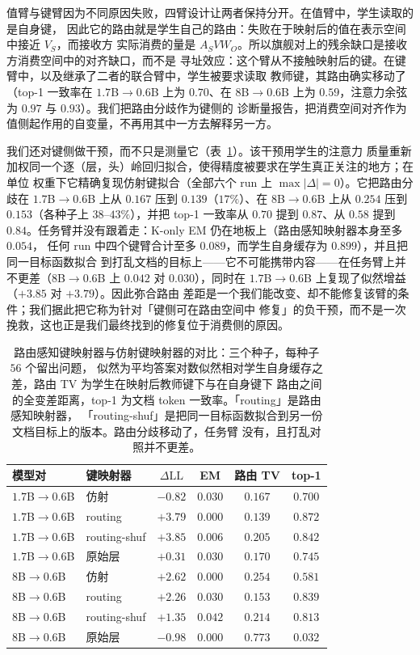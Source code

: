 \documentclass[11pt]{article}
\newcommand{\dll}{\Delta\text{LL}}
\begin{document}
值臂与键臂因为不同原因失败，四臂设计让两者保持分开。在值臂中，学生读取的是自身键，
因此它的路由就是学生自己的路由：失败在于映射后的值在表示空间中接近 $V_S$，而接收方
实际消费的量是 $A_S V W_O$。所以旗舰对上的残余缺口是接收方消费空间中的对齐缺口，而不是
寻址效应：这个臂从不接触映射后的键。在键臂中，以及继承了二者的联合臂中，学生被要求读取
教师键，其路由确实移动了（top-1 一致率在 $1.7$B$\to0.6$B 上为 $0.70$、在
$8$B$\to0.6$B 上为 $0.59$，注意力余弦为 $0.97$ 与 $0.93$）。我们把路由分歧作为键侧的
诊断量报告，把消费空间对齐作为值侧起作用的自变量，不再用其中一方去解释另一方。

我们还对键侧做干预，而不只是测量它（表~\ref{tab:routingkey}）。该干预用学生的注意力
质量重新加权同一个逐（层，头）岭回归拟合，使得精度被要求在学生真正关注的地方；在单位
权重下它精确复现仿射键拟合（全部六个 run 上 $\max|\Delta| = 0$）。它把路由分歧在
$1.7$B$\to0.6$B 上从 $0.167$ 压到 $0.139$（$17\%$）、在 $8$B$\to0.6$B 上从 $0.254$ 压到
$0.153$（各种子上 $38$--$43\%$），并把 top-1 一致率从 $0.70$ 提到 $0.87$、从 $0.58$ 提到
$0.84$。任务臂并没有跟着走：K-only EM 仍在地板上（路由感知映射器本身至多 $0.054$，
任何 run 中四个键臂合计至多 $0.089$，而学生自身缓存为 $0.899$），并且把同一目标函数拟合
到打乱文档的目标上——它不可能携带内容——在任务臂上并不更差（$8$B$\to0.6$B 上 $0.042$ 对
$0.030$），同时在 $1.7$B$\to0.6$B 上复现了似然增益（$+3.85$ 对 $+3.79$）。因此弥合路由
差距是一个我们能改变、却不能修复该臂的条件；我们据此把它称为针对「键侧可在路由空间中
修复」的负干预，而不是一次挽救，这也正是我们最终找到的修复位于消费侧的原因。

\begin{table}[t]
\centering
\small
\caption{路由感知键映射器与仿射键映射器的对比：三个种子，每种子 $56$ 个留出问题，
似然为平均答案对数似然相对学生自身缓存之差，路由 TV 为学生在映射后教师键下与在自身键下
路由之间的全变差距离，top-1 为文档 token 一致率。「routing」是路由感知映射器，
「routing-shuf」是把同一目标函数拟合到另一份文档目标上的版本。路由分歧移动了，任务臂
没有，且打乱对照并不更差。}
\label{tab:routingkey}
\begin{tabular}{llcccc}
\toprule
模型对 & 键映射器 & $\dll$ & EM & 路由 TV & top-1 \\
\midrule
$1.7$B$\to0.6$B & 仿射        & $-0.82$ & $0.030$ & $0.167$ & $0.700$ \\
$1.7$B$\to0.6$B & routing       & $+3.79$ & $0.000$ & $0.139$ & $0.872$ \\
$1.7$B$\to0.6$B & routing-shuf  & $+3.85$ & $0.006$ & $0.205$ & $0.842$ \\
$1.7$B$\to0.6$B & 原始层        & $+0.31$ & $0.030$ & $0.170$ & $0.745$ \\
\midrule
$8$B$\to0.6$B & 仿射          & $+2.62$ & $0.000$ & $0.254$ & $0.581$ \\
$8$B$\to0.6$B & routing         & $+2.26$ & $0.030$ & $0.153$ & $0.839$ \\
$8$B$\to0.6$B & routing-shuf    & $+1.35$ & $0.042$ & $0.214$ & $0.813$ \\
$8$B$\to0.6$B & 原始层          & $-0.98$ & $0.000$ & $0.773$ & $0.032$ \\
\bottomrule
\end{tabular}
\end{table}
\end{document}
